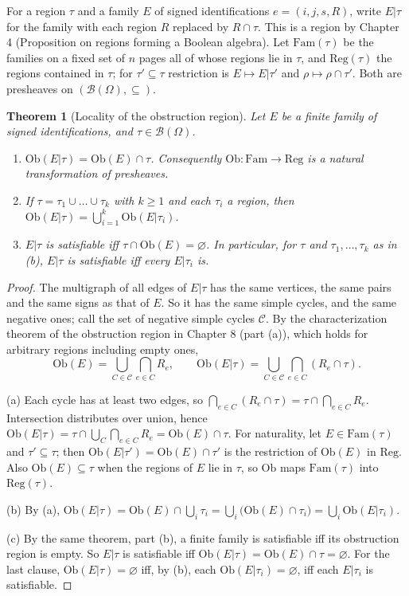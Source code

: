 \documentclass[11pt]{article}
\theoremstyle{plain}
\newtheorem{theorem}{Theorem}
\theoremstyle{definition}
\theoremstyle{remark}
\newcommand{\Om}{\Omega}
\newcommand{\B}{\mathcal{B}}
\newcommand{\Ob}{\mathrm{Ob}}
\begin{document}
For a region $\tau$ and a family $E$ of signed identifications $e=(i,j,s,R)$, write $E|\tau$ for the family with each region $R$ replaced by $R\cap\tau$. This is a region by Chapter 4 (Proposition on regions forming a Boolean algebra). Let $\mathrm{Fam}(\tau)$ be the families on a fixed set of $n$ pages all of whose regions lie in $\tau$, and $\mathrm{Reg}(\tau)$ the regions contained in $\tau$; for $\tau'\subseteq\tau$ restriction is $E\mapsto E|\tau'$ and $\rho\mapsto\rho\cap\tau'$. Both are presheaves on $(\B(\Om),\subseteq)$.

\begin{theorem}[Locality of the obstruction region]\label{thm:local}
Let $E$ be a finite family of signed identifications, and $\tau\in\B(\Om)$.
\begin{enumerate}[label=(\alph*)]
\item $\Ob(E|\tau)=\Ob(E)\cap\tau$. Consequently $\Ob:\mathrm{Fam}\to\mathrm{Reg}$ is a natural transformation of presheaves.
\item If $\tau=\tau_1\cup\dots\cup\tau_k$ with $k\ge1$ and each $\tau_i$ a region, then $\Ob(E|\tau)=\bigcup_{i=1}^k\Ob(E|\tau_i)$.
\item $E|\tau$ is satisfiable iff $\tau\cap\Ob(E)=\varnothing$. In particular, for $\tau$ and $\tau_1,\dots,\tau_k$ as in (b), $E|\tau$ is satisfiable iff every $E|\tau_i$ is.
\end{enumerate}
\end{theorem}

\begin{proof}
The multigraph of all edges of $E|\tau$ has the same vertices, the same pairs and the same signs as that of $E$. So it has the same simple cycles, and the same negative ones; call the set of negative simple cycles $\mathcal C$. By the characterization theorem of the obstruction region in Chapter 8 (part (a)), which holds for arbitrary regions including empty ones,
\[
\Ob(E)=\bigcup_{C\in\mathcal C}\bigcap_{e\in C}R_e,\qquad
\Ob(E|\tau)=\bigcup_{C\in\mathcal C}\bigcap_{e\in C}(R_e\cap\tau).
\]

(a) Each cycle has at least two edges, so $\bigcap_{e\in C}(R_e\cap\tau)=\tau\cap\bigcap_{e\in C}R_e$. Intersection distributes over union, hence $\Ob(E|\tau)=\tau\cap\bigcup_{C}\bigcap_{e\in C}R_e=\Ob(E)\cap\tau$. For naturality, let $E\in\mathrm{Fam}(\tau)$ and $\tau'\subseteq\tau$; then $\Ob(E|\tau')=\Ob(E)\cap\tau'$ is the restriction of $\Ob(E)$ in $\mathrm{Reg}$. Also $\Ob(E)\subseteq\tau$ when the regions of $E$ lie in $\tau$, so $\Ob$ maps $\mathrm{Fam}(\tau)$ into $\mathrm{Reg}(\tau)$.

(b) By (a), $\Ob(E|\tau)=\Ob(E)\cap\bigcup_i\tau_i=\bigcup_i\bigl(\Ob(E)\cap\tau_i\bigr)=\bigcup_i\Ob(E|\tau_i)$.

(c) By the same theorem, part (b), a finite family is satisfiable iff its obstruction region is empty. So $E|\tau$ is satisfiable iff $\Ob(E|\tau)=\Ob(E)\cap\tau=\varnothing$. For the last clause, $\Ob(E|\tau)=\varnothing$ iff, by (b), each $\Ob(E|\tau_i)=\varnothing$, iff each $E|\tau_i$ is satisfiable.
\end{proof}
\end{document}
